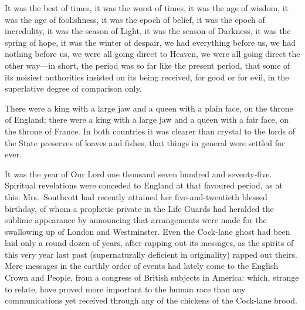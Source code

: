 It was the best of times, it was the worst of times,
it was the age of wisdom, it was the age of foolishness,
it was the epoch of belief, it was the epoch of incredulity,
it was the season of Light, it was the season of Darkness,
it was the spring of hope, it was the winter of despair,
we had everything before us, we had nothing before us,
we were all going direct to Heaven, we were all going direct
the other way---in short, the period was so far like the present
period, that some of its noisiest authorities insisted on its
being received, for good or for evil, in the superlative degree
of comparison only.

There were a king with a large jaw and a queen with a plain face,
on the throne of England; there were a king with a large jaw and
a queen with a fair face, on the throne of France.  In both
countries it was clearer than crystal to the lords of the State
preserves of loaves and fishes, that things in general were
settled for ever.

It was the year of Our Lord one thousand seven hundred and
seventy-five.  Spiritual revelations were conceded to England at
that favoured period, as at this.  Mrs.\ Southcott had recently
attained her five-and-twentieth blessed birthday, of whom a
prophetic private in the Life Guards had heralded the sublime
appearance by announcing that arrangements were made for the
swallowing up of London and Westminster.  Even the Cock-lane
ghost had been laid only a round dozen of years, after rapping
out its messages, as the spirits of this very year last past
(supernaturally deficient in originality) rapped out theirs.
Mere messages in the earthly order of events had lately come to
the English Crown and People, from a congress of British subjects
in America:  which, strange to relate, have proved more important
to the human race than any communications yet received through
any of the chickens of the Cock-lane brood.

